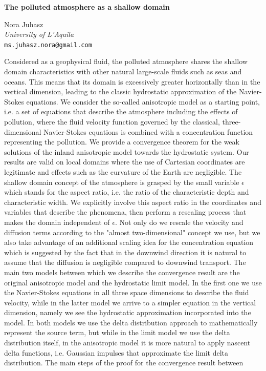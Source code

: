 \documentclass[twoside]{article}
\begin{document}

\begin{center}
\textbf{\large The polluted atmosphere as a shallow domain}
\end{center}

\medskip


\begin{center}
Nora Juhasz\\
\emph{University  of L'Aquila}\\
\texttt{ms.juhasz.nora@gmail.com}
\end{center}

\bigskip

\noindent
Considered as a geophysical fluid, the polluted atmosphere shares the shallow domain characteristics with other natural large-scale fluids such as seas and oceans. This means that its domain is excessively greater horizontally than in the vertical dimension, leading to the classic hydrostatic approximation of the Navier-Stokes equations. We consider the so-called anisotropic model as a starting point, i.e. a set of equations that describe the atmosphere including the effects of pollution, where the fluid velocity function governed by the classical, three-dimensional Navier-Stokes equations is combined with a concentration function representing the pollution.  We provide a convergence theorem for the weak solutions of the inland anisotropic model towards the hydrostatic system. Our results are valid on local domains where the use of Cartesian coordinates are legitimate and effects such as the curvature of the Earth are negligible. The shallow domain concept of the atmosphere is grasped by the small variable $\epsilon$ which stands for the aspect ratio, i.e. the ratio of the characteristic depth and characteristic width. We explicitly involve this aspect ratio in the coordinates and variables that describe the phenomena, then perform a rescaling process that makes the domain independent of $\epsilon$. Not only do we rescale the velocity and diffusion terms according to the "almost two-dimensional" concept we use, but we also take advantage of an additional scaling idea for the concentration equation which is suggested by the fact that in the downwind direction it is natural to assume that the diffusion is negligible compared to downwind transport. The main two models between which we describe the convergence result are the original anisotropic model and the hydrostatic limit model. In the first one we use the Navier-Stokes equations in all three space dimensions to describe the fluid velocity, while in the latter model we arrive to a simpler equation in the vertical dimension, namely we see the hydrostatic approximation incorporated into the model. In both models we use the delta distribution approach to mathematically represent the source term, but while in the limit model we use the delta distribution itself, in the anisotropic model it is more natural to apply nascent delta functions, i.e. Gaussian impulses that approximate the limit delta distribution. The main steps of the proof for the convergence result between 
\end{document}
